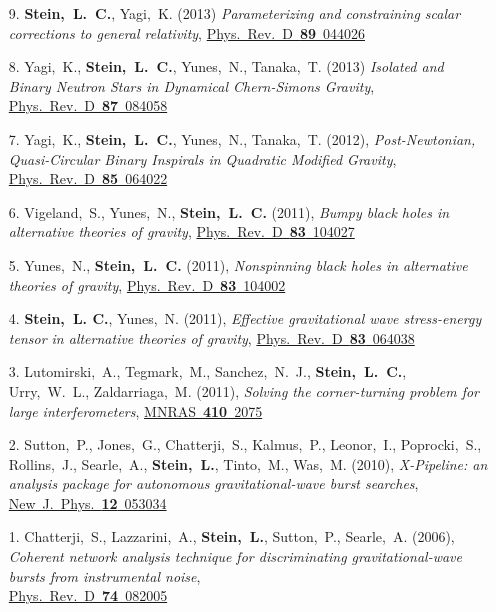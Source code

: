 \begin{enumerate}
\item[{9.}] {\bf Stein,~L.~C.}, Yagi,~K. (2013)
  {\it Parameterizing and constraining scalar corrections to general relativity},
  \href{http://dx.doi.org/10.1103/PhysRevD.89.044026}{Phys.~Rev.~D~{\bf 89}~044026}
\item[{8.}] Yagi,~K., {\bf Stein,~L.~C.}, Yunes,~N., Tanaka,~T. (2013)
  {\it Isolated and Binary Neutron Stars in Dynamical Chern-Simons
    Gravity},
  \href{http://dx.doi.org/10.1103/PhysRevD.87.084058}{Phys.~Rev.~D~{\bf 87}~084058}
\item[{7.}] Yagi,~K., {\bf Stein,~L.~C.}, Yunes,~N.,
  Tanaka,~T. (2012), {\it Post-Newtonian, Quasi-Circular Binary
    Inspirals in Quadratic Modified Gravity},
  \href{http://dx.doi.org/10.1103/PhysRevD.85.064022}{Phys.~Rev.~D~{\bf 85}~064022}
\item[{6.}] Vigeland,~S., Yunes,~N., {\bf Stein,~L.~C.} (2011), {\it
    Bumpy black holes in alternative theories of gravity},
  \href{http://dx.doi.org/10.1103/PhysRevD.83.104027}{Phys.~Rev.~D~{\bf 83}~104027}
\item[{5.}] Yunes,~N., {\bf Stein,~L.~C.} (2011), {\it Nonspinning
    black holes in alternative theories of gravity},
  \href{http://dx.doi.org/10.1103/PhysRevD.83.104002}{Phys.~Rev.~D~{\bf 83}~104002}
\item[{4.}] {\bf Stein,~L. C.}, Yunes,~N. (2011), {\it Effective
    gravitational wave stress-energy tensor in alternative theories of
    gravity},
  \href{http://dx.doi.org/10.1103/PhysRevD.83.064038}{Phys.~Rev.~D~{\bf 83}~064038}
\item[{3.}] Lutomirski,~A., Tegmark,~M., Sanchez,~N.~J., {\bf
    Stein,~L.~C.},
  Urry,~W.~L., Zaldarriaga,~M. (2011), {\it Solving the
    corner-turning problem for large interferometers},
  \href{http://dx.doi.org/10.1111/j.1365-2966.2010.17587.x}{MNRAS~{\bf 410}~2075}
\item[{2.}] Sutton,~P., Jones,~G., Chatterji,~S., Kalmus,~P., Leonor,~I.,
  Poprocki,~S., Rollins,~J., Searle,~A., {\bf Stein,~L.}, Tinto,~M.,
  Was,~M. (2010), {\it X-Pipeline: an analysis package for autonomous
    gravitational-wave burst searches},
  \href{http://dx.doi.org/10.1088/1367-2630/12/5/053034}{New~J.~Phys.~{\bf 12}~053034}
\item[{1.}] Chatterji,~S., Lazzarini,~A., {\bf Stein,~L.}, Sutton,~P.,
  Searle,~A. (2006), {\it Coherent network analysis technique for
    discriminating gravitational-wave bursts from instrumental noise},\\
  \href{http://dx.doi.org/10.1103/PhysRevD.74.082005}{Phys.~Rev.~D~{\bf 74}~082005}
\end{enumerate}

